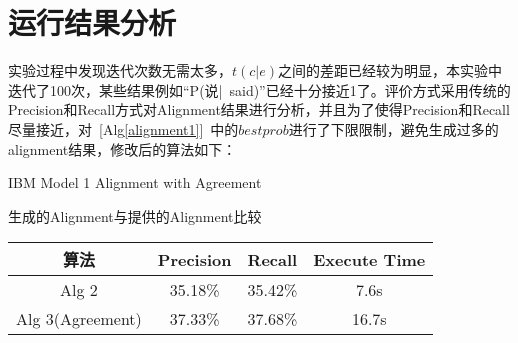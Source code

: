 \documentclass[11pt]{article}
\begin{document}
\section{运行结果分析}
\hspace{1.6em} 实验过程中发现迭代次数无需太多，$t(c|e)$之间的差距已经较为明显，本实验中迭代了100次，某些结果例如“P(说|~said)”已经十分接近1了。评价方式采用传统的Precision和Recall方式对Alignment结果进行分析，并且为了使得Precision和Recall尽量接近，对~[Alg\ref{alignment1}]~中的$bestprob$进行了下限限制，避免生成过多的alignment结果，修改后的算法如下：
\begin{algorithm}
\caption{IBM Model 1 Alignment with Agreement}\label{alignment2}
    \begin{algorithmic}
                    \EndIf
                \EndFor
                        \EndIf
                    \EndFor
                \EndIf
            \EndFor
        \EndFor
    \end{algorithmic}
\end{algorithm}
\newline
\hspace*{1.6em} 生成的Alignment与提供的Alignment比较
\begin{center}
\begin{tabular}{|c|c|c|c|}
  \hline
  算法 & Precision & Recall & Execute Time\\ \hline
  Alg 2 & 35.18\% & 35.42\% & 7.6s\footnotemark \\ \hline
  Alg 3(Agreement) & 37.33\% & 37.68\% & 16.7s \\
  \hline
\end{tabular}
\end{center}
\end{document}
